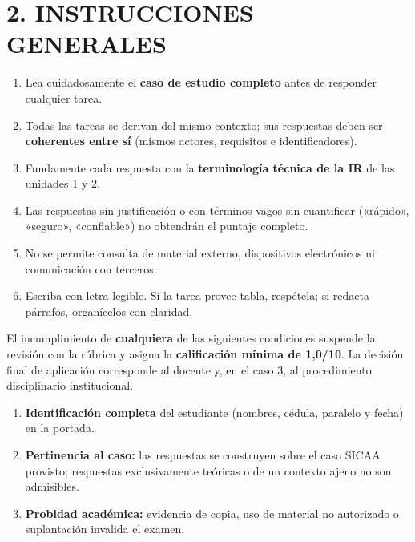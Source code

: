 \documentclass[11pt]{article}
\begin{document}
\section*{\textcolor{utegreendk}{2. INSTRUCCIONES GENERALES}}

\begin{enumerate}[leftmargin=18pt,itemsep=2pt]
  \item Lea cuidadosamente el \textbf{caso de estudio completo} antes de responder cualquier tarea.
  \item Todas las tareas se derivan del mismo contexto; sus respuestas deben ser \textbf{coherentes entre sí} (mismos actores, requisitos e identificadores).
  \item Fundamente cada respuesta con la \textbf{terminología técnica de la IR} de las unidades 1 y 2.
  \item Las respuestas sin justificación o con términos vagos sin cuantificar («rápido», «seguro», «confiable») no obtendrán el puntaje completo.
  \item No se permite consulta de material externo, dispositivos electrónicos ni comunicación con terceros.
  \item Escriba con letra legible. Si la tarea provee tabla, respétela; si redacta párrafos, organícelos con claridad.
\end{enumerate}

\begin{tcolorbox}[colback=lightred,colframe=red!60!black,
  title=\textbf{Condiciones de admisión (gatekeeper) --- verificación previa a la calificación},
  fonttitle=\bfseries,boxrule=0.8pt,arc=2mm]
El incumplimiento de \textbf{cualquiera} de las siguientes condiciones suspende la revisión con la rúbrica y asigna la \textbf{calificación mínima de 1{,}0/10}. La decisión final de aplicación corresponde al docente y, en el caso 3, al procedimiento disciplinario institucional.
\begin{enumerate}[leftmargin=18pt,itemsep=2pt]
  \item \textbf{Identificación completa} del estudiante (nombres, cédula, paralelo y fecha) en la portada.
  \item \textbf{Pertinencia al caso:} las respuestas se construyen sobre el caso SICAA provisto; respuestas exclusivamente teóricas o de un contexto ajeno no son admisibles.
  \item \textbf{Probidad académica:} evidencia de copia, uso de material no autorizado o suplantación invalida el examen.
\end{enumerate}
\end{tcolorbox}
\end{document}

